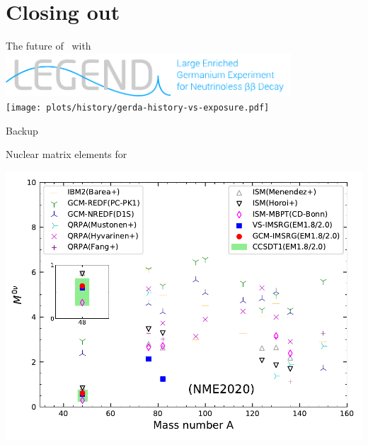 \documentclass[10pt,aspectratio=169]{beamer}
\begin{document}
\section{Closing out}
\begin{frame}{The future of \onbb\ with \gesix}
  \centering
  \vspace*{0.5cm}
  \includegraphics[width=0.8\textwidth]{logos/legend-logo-wtag.pdf} \\
  \vspace*{0.7cm}
  \texttt{[image: plots/history/gerda-history-vs-exposure.pdf]} \hspace*{1cm}
\end{frame}
\appendix
\begin{frame}[standout]{}
  Backup
\end{frame}
\begin{frame}{Nuclear matrix elements for \texorpdfstring{\onbb}{0νββ}}
  \begin{center}
    \includegraphics[height=0.9\textheight]{plots/theory/0nbb-nme.pdf}
  \end{center}
\end{frame}
\end{document}
